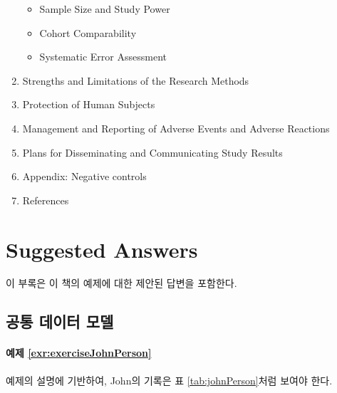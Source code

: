 \documentclass[10.5pt]{book}
\providecommand{\tightlist}{%
  \setlength{\itemsep}{0pt}\setlength{\parskip}{0pt}}
\theoremstyle{definition}
\theoremstyle{definition}
\theoremstyle{definition}
\theoremstyle{remark}
\begin{document}
\begin{enumerate}
  \begin{itemize}
  \tightlist
  \item
    Sample Size and Study Power\\
  \item
    Cohort Comparability\\
  \item
    Systematic Error Assessment\\
  \end{itemize}
\item
  Strengths and Limitations of the Research Methods\\
\item
  Protection of Human Subjects\\
\item
  Management and Reporting of Adverse Events and Adverse Reactions\\
\item
  Plans for Disseminating and Communicating Study Results
\item
  Appendix: Negative controls
\item
  References
\end{enumerate}

\chapter{Suggested Answers}\label{SuggestedAnswers}

이 부록은 이 책의 예제에 대한 제안된 답변을 포함한다.

\section{공통 데이터 모델}\label{Cdmanswers}

\subsubsection*{예제
\ref{exr:exerciseJohnPerson}}\label{-refexrexercisejohnperson}

예제의 설명에 기반하여, John의 기록은 표 \ref{tab:johnPerson}처럼 보여야
한다.
\end{document}
